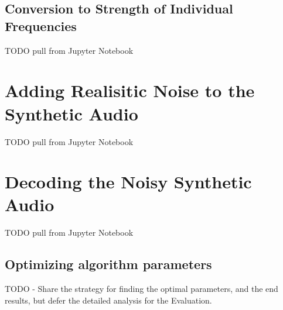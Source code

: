 \subsection{Conversion to Strength of Individual Frequencies}
TODO pull from Jupyter Notebook


\section{Adding Realisitic Noise to the Synthetic Audio}

TODO pull from Jupyter Notebook


\section{Decoding the Noisy Synthetic Audio}

TODO pull from Jupyter Notebook

\subsection{Optimizing algorithm parameters}
TODO - Share the strategy for finding the optimal parameters, and the end results, but defer the detailed analysis for the Evaluation.
